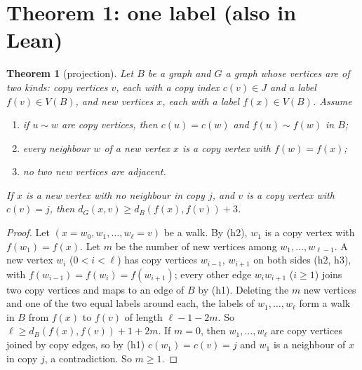 \documentclass[11pt]{amsart}
\theoremstyle{plain}
\newtheorem{theorem}{Theorem}
\theoremstyle{definition}
\theoremstyle{remark}
\begin{document}
\section{Theorem 1: one label (also in Lean)}\label{sec:one}

\begin{theorem}[projection]\label{thm:one}
Let $B$ be a graph and $G$ a graph whose vertices are of two kinds: \emph{copy vertices} $v$, each with a copy index
$c(v) \in J$ and a label $f(v) \in V(B)$, and \emph{new vertices} $x$, each with a label $f(x) \in V(B)$. Assume
\begin{enumerate}[label=(h\arabic*)]
\item if $u \sim w$ are copy vertices, then $c(u) = c(w)$ and $f(u) \sim f(w)$ in $B$;
\item every neighbour $w$ of a new vertex $x$ is a copy vertex with $f(w) = f(x)$;
\item no two new vertices are adjacent.
\end{enumerate}
If $x$ is a new vertex with no neighbour in copy $j$, and $v$ is a copy vertex with $c(v) = j$, then
$d_G(x,v) \ge d_B(f(x), f(v)) + 3$.
\end{theorem}

\begin{proof}
Let $(x = w_0, w_1, \dots, w_\ell = v)$ be a walk. By (h2), $w_1$ is a copy vertex with $f(w_1) = f(x)$. Let $m$ be the
number of new vertices among $w_1, \dots, w_{\ell-1}$. A new vertex $w_i$ ($0 < i < \ell$) has copy vertices $w_{i-1}$,
$w_{i+1}$ on both sides (h2, h3), with $f(w_{i-1}) = f(w_i) = f(w_{i+1})$; every other edge $w_iw_{i+1}$ ($i \ge 1$)
joins two copy vertices and maps to an edge of $B$ by (h1). Deleting the $m$ new vertices and one of the two equal labels
around each, the labels of $w_1, \dots, w_\ell$ form a walk in $B$ from $f(x)$ to $f(v)$ of length $\ell - 1 - 2m$. So
$\ell \ge d_B(f(x), f(v)) + 1 + 2m$. If $m = 0$, then $w_1, \dots, w_\ell$ are copy vertices joined by copy edges, so by
(h1) $c(w_1) = c(v) = j$ and $w_1$ is a neighbour of $x$ in copy $j$, a contradiction. So $m \ge 1$.
\end{proof}
\end{document}
